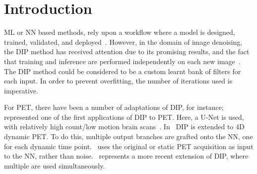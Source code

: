 \section{Introduction} \label{sec:introduction}
     \gls{ML} or \gls{NN} based methods, rely upon a workflow where a model is designed, trained, validated, and deployed~\cite{Krose2011AnNetworks}.%
    However, in the domain of image denoising, the \gls{DIP} method has received attention due to its promising results, and the fact that training and inference are performed independently on each new image~\cite{Ulyanov2018DeepPrior}. The \gls{DIP} method could be considered to be a custom learnt bank of filters for each input. In order to prevent overfitting, the number of iterations used is imperative.%
    
    For \gls{PET}, there have been a number of adaptations of \gls{DIP}, for instance;~\cite{Gong2019PETPrior} represented one of the first applications of \gls{DIP} to \gls{PET}. Here, a U-Net is used, with relatively high count/low motion brain scans~\cite{Weng2015U-Net:Segmentation}. In~\cite{Hashimoto20214DNetwork} \gls{DIP} is extended to \gls{4D} dynamic \gls{PET}. To do this, multiple output branches are grafted onto the \gls{NN}, one for each dynamic time point.~\cite{Hashimoto2019DynamicDatasets} uses the original or static \gls{PET} acquisition as input to the \gls{NN}, rather than noise.~\cite{Yang2022SimultaneousPrior} represents a more recent extension of \gls{DIP}, where multiple  are used simultaneously.
    
